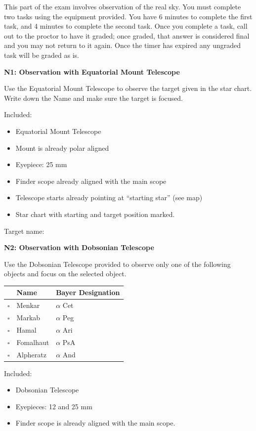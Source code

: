 This part of the exam involves observation of the real sky. You must
complete two tasks using the equipment provided. You have 6 minutes to
complete the first task, and 4 minutes to complete the second task. Once you
complete a task, call out to the proctor to have it graded; once graded,
that answer is considered final and you may not return to it again. Once the
timer has expired any ungraded task will be graded as is.

\textbf{N1: Observation with Equatorial Mount Telescope}

Use the Equatorial Mount Telescope to observe the target given in the star
chart. Write down the Name and make sure the target is focused.

Included:
\begin{itemize}
\item Equatorial Mount Telescope
\item Mount is already polar aligned
\item Eyepiece: 25 mm
\item Finder scope already aligned with the main scope
\item Telescope starts already pointing at ``starting star'' (see map)
\item Star chart with starting and target position marked.
\end{itemize}

Target name: \underline{\hspace{5cm}}


\textbf{N2: Observation with Dobsonian Telescope}

Use the Dobsonian Telescope provided to observe only one of the following
objects and focus on the selected object.

\begin{center}
\begin{tabular}{cll}
 & Name & Bayer Designation \\
\hline
$\square$ & Menkar & $\alpha$ Cet \\
$\square$ & Markab & $\alpha$ Peg \\
$\square$ & Hamal & $\alpha$ Ari \\
$\square$ & Fomalhaut & $\alpha$ PsA \\
$\square$ & Alpheratz & $\alpha$ And \\
\end{tabular}
\end{center}

Included:
\begin{itemize}
\item Dobsonian Telescope
\item Eyepieces: 12 and 25 mm
\item Finder scope is already aligned with the main scope.
\end{itemize}
